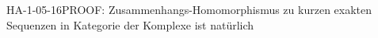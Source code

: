 
\begin{REM}{HA-1-05-16}{PROOF: Zusammenhangs-Homomorphismus zu kurzen exakten Sequenzen in Kategorie der Komplexe ist natürlich}
\end{REM}

